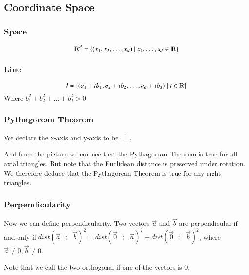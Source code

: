 \documentclass [12 pt, twoside] {book}
\newcommand\+{\text{ }}
\begin{document}
\subsection{Coordinate Space}
\subsubsection{Space}
$$\varmathbb{R}^d = \{(x_1, x_2, \dots, x_d) \+|\+ x_1, \dots, x_d \in
\varmathbb{R}\}$$
\subsubsection{Line}
$$l = \{(a_1 + tb_1, a_2 + tb_2, \dots, a_d + tb_d)\+|\+t\in\varmathbb{R}\}$$
Where $b_1^2 + b_2^2 + \dots + b_d^2 > 0$
\subsubsection{Pythagorean Theorem}
\begin{figure}[ht]
    \centering
\end{figure}

We declare the x-axis and y-axis to be $\perp$.

And from the picture we can see that the Pythagorean Theorem is true for all
axial triangles. But note that the Euclidean distance is preserved under
rotation. We therefore deduce that the Pythagorean Theorem is true for any
right triangles.

\subsubsection{Perpendicularity}

Now we can define perpendicularity. Two vectors $\vec{a}$ and $\vec{b}$ are
perpendicular if and only if $dist(\vec{a}\+;\+\vec{b})^2 =
dist(\vec{0}\+;\+\vec{a})^2 + dist(\vec{0}\+;\+\vec{b})^2$, where $\vec{a}
\neq 0, \vec{b} \neq 0$.

Note that we call the two orthogonal if one of the vectors is 0.
\end{document}
